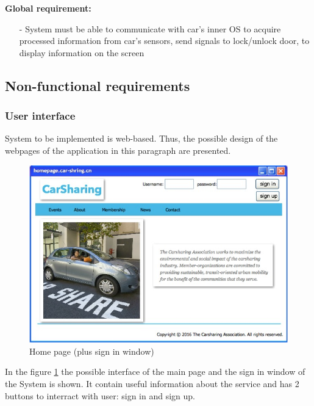 \documentclass[12pt, letterpaper]{article}
\begin{document}
\textbf{Global requirement:} \\
\begin{itemize}
	\item[-] System must be able to communicate with car’s inner OS to acquire processed
	information from car’s sensors, send signals to lock/unlock door, to display
	information on the screen
\end{itemize}

\subsection{Non-functional requirements}
\subsubsection{User interface}

System to be implemented is web-based. Thus, the possible design of the webpages of the application in this paragraph are presented. \\

\begin{figure}[H]
\centering
\includegraphics[width=12cm]{Homepage.jpg}
\caption{Home page (plus sign in window)}
\label{fig:Home}
\end{figure}

In the figure \ref{fig:Home} the possible interface of the main page and the sign in window of the System is shown. It contain useful information about the service and has 2 buttons to interract with user: sign in and sign up. \\
\end{document}
